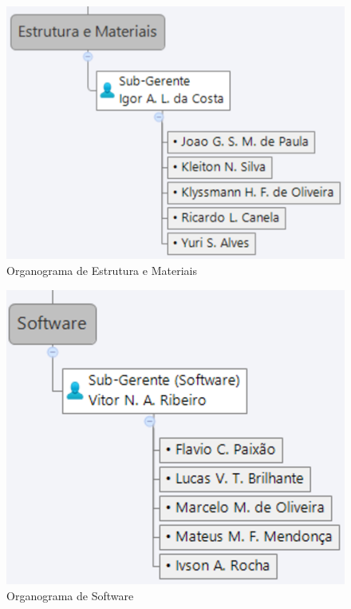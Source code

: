 \begin{figure}[H]
  \begin{center}
	\includegraphics[keepaspectratio,scale=0.6]{figuras/estrutura_materiais.eps}
	\caption{Organograma de Estrutura e Materiais}
  \end{center}
\end{figure}

\begin{figure}[H]
  \begin{center}
	\includegraphics[keepaspectratio,scale=0.6]{figuras/software.eps}
	\caption{Organograma de Software}
  \end{center}
\end{figure}
